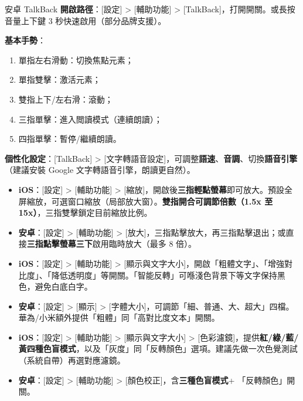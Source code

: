\begin{tcbinfo}{安卓 TalkBack}
\textbf{開啟路徑}：[設定] > [輔助功能] > [TalkBack]，打開開關。或長按音量上下鍵 3 秒快速啟用（部分品牌支援）。

\textbf{基本手勢}：

\begin{enumerate}
  \item 單指左右滑動：切換焦點元素；
  \item 單指雙擊：激活元素；
  \item 雙指上下/左右滑：滾動；
  \item 三指單擊：進入閲讀模式（連續朗讀）；
  \item 四指單擊：暫停/繼續朗讀。
\end{enumerate}

\textbf{個性化設定}：[TalkBack] > [文字轉語音設定]，可調整\textbf{語速}、\textbf{音調}、切換\textbf{語音引擎}（建議安裝 Google 文字轉語音引擎，朗讀更自然）。

\end{tcbinfo}



\begin{itemize}
  \item \textbf{iOS}：[設定] > [輔助功能] > [縮放]，開啟後\textbf{三指輕點螢幕}即可放大。預設全屏縮放，可選窗口縮放（局部放大窗）。\textbf{雙指開合可調節倍數（1.5x 至 15x）}，三指雙擊鎖定目前縮放比例。
  \item \textbf{安卓}：[設定] > [輔助功能] > [放大]，三指點擊放大，再三指點擊退出；或直接\textbf{三指點擊螢幕三下}啟用臨時放大（最多 8 倍）。
\end{itemize}


\begin{itemize}
  \item \textbf{iOS}：[設定] > [輔助功能] > [顯示與文字大小]，開啟「粗體文字」、「增強對比度」、「降低透明度」等開關。「智能反轉」可喺淺色背景下等文字保持黑色，避免白底白字。
  \item \textbf{安卓}：[設定] > [顯示] > [字體大小]，可調節「細、普通、大、超大」四檔。華為/小米額外提供「粗體」同「高對比度文本」開關。
\end{itemize}


\begin{itemize}
  \item \textbf{iOS}：[設定] > [輔助功能] > [顯示與文字大小] > [色彩濾鏡]，提供\textbf{紅/綠/藍/黃四種色盲模式}，以及「灰度」同「反轉顏色」選項。建議先做一次色覺測試（系統自帶）再選對應濾鏡。
  \item \textbf{安卓}：[設定] > [輔助功能] > [顏色校正]，含\textbf{三種色盲模式}+ 「反轉顏色」開關。
\end{itemize}

